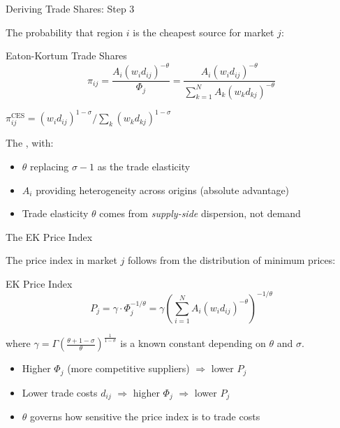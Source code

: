 \documentclass{beamer}
\begin{document}
\begin{frame}{Deriving Trade Shares: Step 3}

    The probability that region $i$ is the cheapest source for market $j$:

    \vspace{0.3em}
    \begin{block}{Eaton-Kortum Trade Shares}
        \vspace{-0.5em}
        \[ \pi_{ij} = \frac{A_i (w_i d_{ij})^{-\theta}}{\Phi_j} = \frac{A_i (w_i d_{ij})^{-\theta}}{\displaystyle\sum_{k=1}^{N} A_k (w_k d_{kj})^{-\theta}} \]
    \end{block}

    \vspace{0.2em}
    $\pi_{ij}^{\text{CES}} = (w_i d_{ij})^{1-\sigma}/\sum_k (w_k d_{kj})^{1-\sigma}$

    \vspace{0.2em}
    The , with:
    \begin{itemize}
        \item $\theta$ replacing $\sigma - 1$ as the trade elasticity
        \item $A_i$ providing heterogeneity across origins (absolute advantage)
        \item Trade elasticity $\theta$ comes from \emph{supply-side} dispersion, not demand
    \end{itemize}

\end{frame}

\begin{frame}{The EK Price Index}

    The price index in market $j$ follows from the distribution of minimum prices:

    \begin{block}{EK Price Index}
        \vspace{-0.5em}
        \[ P_j = \gamma \cdot \Phi_j^{-1/\theta} = \gamma \left(\sum_{i=1}^{N} A_i (w_i d_{ij})^{-\theta}\right)^{-1/\theta} \]
    \end{block}

    \vspace{0.2em}
    where $\gamma = \Gamma\!\left(\frac{\theta+1-\sigma}{\theta}\right)^{\frac{1}{1-\sigma}}$ is a known constant depending on $\theta$ and $\sigma$.

    \vspace{0.3em}
    \begin{itemize}
        \item Higher $\Phi_j$ (more competitive suppliers) $\Rightarrow$ lower $P_j$
        \item Lower trade costs $d_{ij}$ $\Rightarrow$ higher $\Phi_j$ $\Rightarrow$ lower $P_j$
        \item $\theta$ governs how sensitive the price index is to trade costs
    \end{itemize}

    \vspace{0.2em}

\end{frame}
\end{document}
